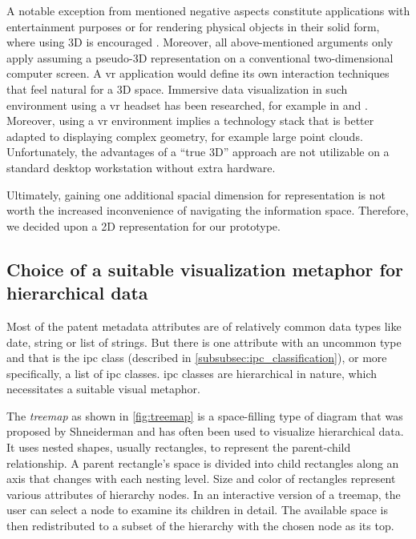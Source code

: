 A notable exception from mentioned negative aspects constitute applications with entertainment purposes or for rendering physical objects in their solid form, where using 3D is encouraged \cite{Nielsen1998}.
Moreover, all above-mentioned arguments only apply assuming a pseudo-3D representation on a conventional two-dimensional computer screen.
A \gls{vr} application would define its own interaction techniques that feel natural for a 3D space.
Immersive data visualization in such environment using a \gls{vr} headset has been researched, for example in \cite{djorgovski2018immersive} and \cite{Hadjar2018}. 
Moreover, using a \gls{vr} environment implies a technology stack that is better adapted to displaying complex geometry, for example large point clouds.
Unfortunately, the advantages of a ``true 3D'' approach are not utilizable on a standard desktop workstation without extra hardware.

Ultimately, gaining one additional spacial dimension for representation is not worth the increased inconvenience of navigating the information space.
Therefore, we decided upon a 2D representation for our prototype.

\subsection{Choice of a suitable visualization metaphor for hierarchical data}

Most of the patent metadata attributes are of relatively common data types like date, string or list of strings.
But there is one attribute with an uncommon type and that is the \gls{ipc} class (described in \autoref{subsubsec:ipc_classification}), or more specifically, a list of \gls{ipc} classes.
\gls{ipc} classes are hierarchical in nature, which necessitates a suitable visual metaphor.

The \textit{treemap} as shown in \autoref{fig:treemap} is a space-filling type of diagram that was proposed by Shneiderman \cite{Shneiderman1992} and has often been used to visualize hierarchical data.
It uses nested shapes, usually rectangles, to represent the parent-child relationship.
A parent rectangle's space is divided into child rectangles along an axis that changes with each nesting level.
Size and color of rectangles represent various attributes of hierarchy nodes.
In an interactive version of a treemap, the user can select a node to examine its children in detail.
The available space is then redistributed to a subset of the hierarchy with the chosen node as its top.

